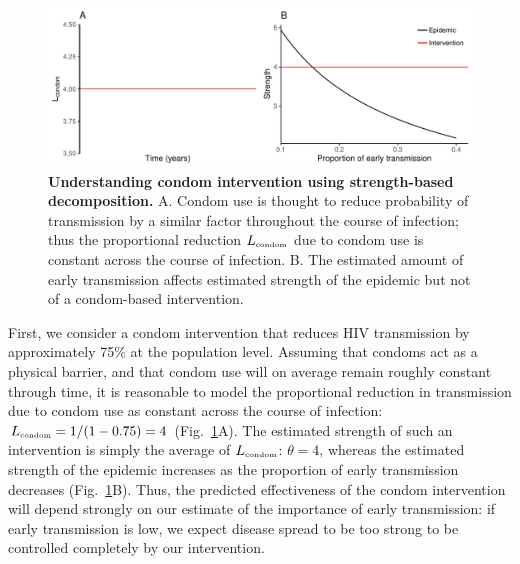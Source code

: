 \documentclass[12pt]{article}
\newcommand{\tsub}[2]{#1_{{\textrm{\tiny #2}}}}
\newcommand{\figref}[1]{Fig.~\ref{fig:#1}}
\newcommand{\figlab}[1]{\label{fig:#1}}
\begin{document}
\begin{figure}[!t]
\includegraphics[width=\textwidth]{../figure/condom.pdf}
\caption{
\textbf{Understanding condom intervention using strength-based decomposition.}
A. Condom use is thought to reduce probability of transmission by a similar factor throughout the course of infection; thus the proportional reduction $\tsub{L}{condom}$ due to condom use is constant across the course of infection.
B. The estimated amount of early transmission affects estimated strength of the epidemic but not of a condom-based intervention.
}
\figlab{condom}
\end{figure}

First, we consider a condom intervention that reduces HIV transmission by approximately 75\% at the population level.
Assuming that condoms act as a physical barrier, and that condom use will on average remain roughly constant through time, it is reasonable to model the proportional reduction in transmission due to condom use as constant across the course of infection: $\tsub{L}{condom} = 1/(1-0.75) = 4$  (\figref{condom}A).
The estimated strength of such an intervention is simply the average of $\tsub{L}{condom}$: $\theta=4$, whereas the estimated strength of the epidemic increases as the proportion of early transmission decreases (\figref{condom}B).
Thus, the predicted effectiveness of the condom intervention will depend strongly on our estimate of the importance of early transmission: if early transmission is low, we expect disease spread to be too strong to be controlled completely by our intervention.
\end{document}
